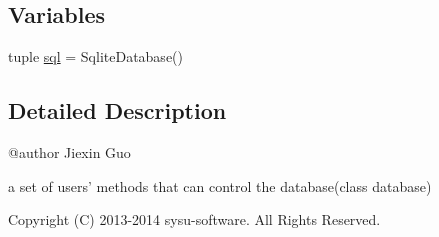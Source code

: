 \subsection*{Variables}
\begin{DoxyCompactItemize}
\item 
tuple \hyperlink{namespaceweb_1_1user_ae4c15c998e969053728966b533ddb61d}{sql} = Sqlite\-Database()
\end{DoxyCompactItemize}


\subsection{Detailed Description}
\begin{DoxyVerb}@author Jiexin Guo

a set of users' methods that can control the database(class database)

Copyright (C) 2013-2014 sysu-software. All Rights Reserved.
\end{DoxyVerb}
 

